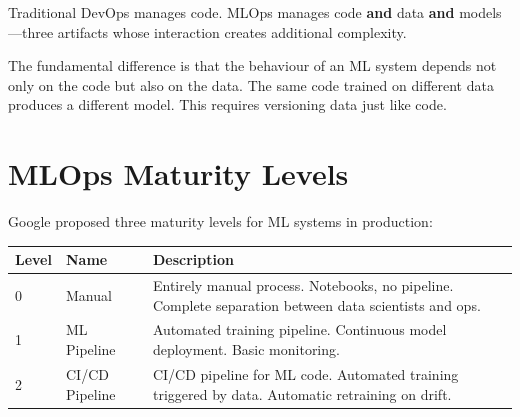 Traditional DevOps manages code. MLOps manages code \textbf{and} data
\textbf{and} models---three artifacts whose interaction creates additional
complexity.

\begin{center}
\end{center}

\begin{remark}
The fundamental difference is that the behaviour of an ML system depends
not only on the code but also on the data. The same code trained on
different data produces a different model. This requires versioning data
just like code.
\end{remark}

\section{MLOps Maturity Levels}
\label{sec:maturity-levels}

Google proposed three maturity levels for ML systems in production:

\begin{center}
\begin{tabular}{@{}llp{7cm}@{}}
\toprule
\textbf{Level} & \textbf{Name} & \textbf{Description} \\
\midrule
0 & Manual & Entirely manual process. Notebooks, no pipeline. Complete
  separation between data scientists and ops. \\
1 & ML Pipeline & Automated training pipeline. Continuous model deployment.
  Basic monitoring. \\
2 & CI/CD Pipeline & CI/CD pipeline for ML code. Automated training
  triggered by data. Automatic retraining on drift. \\
\bottomrule
\end{tabular}
\end{center}

